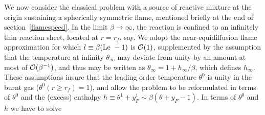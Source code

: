 We now consider the classical problem with a source of reactive mixture at the origin sustaining
a spherically symmetric flame, mentioned briefly at the end of section~\ref{flamespeed}.
In the limit $\beta \rightarrow \infty$, the reaction is confined to
an infinitely thin reaction sheet, located at $r=r_f$, say. We adopt the near-equidiffusion flame approximation for
 which $l \equiv \beta (\text{Le } - 1)$ is ${\cal{O}}(1)$, supplemented by the assumption that
the temperature at infinity $\theta_{\infty}$ may deviate from unity by
an amount at most of ${\cal{O}}(\beta^{-1})$, and thus may be
written as $\theta_{\infty} = 1+ h_{\infty}/\beta$, which defines $h_{\infty}$. These
assumptions insure that the leading order temperature $\theta^0$ is
unity in the burnt gas ($\theta^{0}(r\geq r_f)=1$), and allow the
problem to be reformulated in terms of   $\theta^0$ and the
(excess) enthalpy $h \equiv \theta^1+y_F^1 \sim \beta (\theta+y_F -1)$.
In terms of $\theta^0$ and $h$ we have to solve
